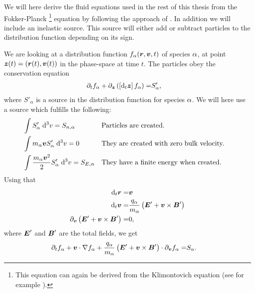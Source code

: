 We will here derive the fluid equations used in the rest of this thesis from the Fokker-Planck%
\footnote{
    This equation can again be derived from the Klimontovich equation (see for example \cite{Klimontovich1983book}).
}
%
 equation by following the approach of \cite{Helander2002book}.
In addition we will include an inelastic source.
This source will either add or subtract particles to the distribution function depending on its sign.

We are looking at a distribution function $f_\alpha(\boldsymbol{r},\boldsymbol{v},t)$ of species $\alpha$, at point $\boldsymbol{z}(t)=(\boldsymbol{r}(t),\boldsymbol{v}(t))$ in the phase-space at time $t$.
The particles obey the conservation equation
%
\begin{align*}
    \partial_t f_\alpha + \partial_{\boldsymbol{z}} \left(\left[\text{d}_t \boldsymbol{z}\right]f_\alpha\right) =& S'_\alpha,
\end{align*}
%
where $S'_\alpha$ is a source in the distribution function for species $\alpha$.
We will here use a source which fulfills the following:
%
\begin{align*}
    &\int {S'_{\alpha}} \; \text{d} {^3v} = S_{n,\alpha}&
    &\text{Particles are created.}&
    \\
    &\int {m_\alpha\boldsymbol{v} S'_\alpha} \; \text{d} {^3v} = 0&
    &\text{They are created with zero bulk velocity.}&
    \\
    &\int {\frac{m_\alpha\boldsymbol{v}^2}{2} S'_\alpha} \; \text{d} {^3v} = S_{E,\alpha}&
    &\text{They have a finite energy when created.}&
\end{align*}
%
Using that
%
\begin{align*}
    \text{d}_t \boldsymbol{r}     =& \boldsymbol{v}\\
    \text{d}_t \boldsymbol{v}     =& \frac{q_\alpha}{m_\alpha}\left(\boldsymbol{E}'+\boldsymbol{v}\times\boldsymbol{B}'\right)\\
    \partial_{\boldsymbol{v}} \left(\boldsymbol{E}'+\boldsymbol{v}\times\boldsymbol{B}'\right) =& 0,
\end{align*}
%
where $\boldsymbol{E}'$ and $\boldsymbol{B}'$ are the total fields, we get
%
\begin{align*}
      \partial_t f_\alpha
    + \boldsymbol{v}\cdot\nabla f_\alpha
    + \frac{q_\alpha}{m_\alpha}
      \left(\boldsymbol{E}'+\boldsymbol{v}\times\boldsymbol{B}'\right)\cdot\partial_{\boldsymbol{v}}f_\alpha
    =& S_\alpha.
\end{align*}

